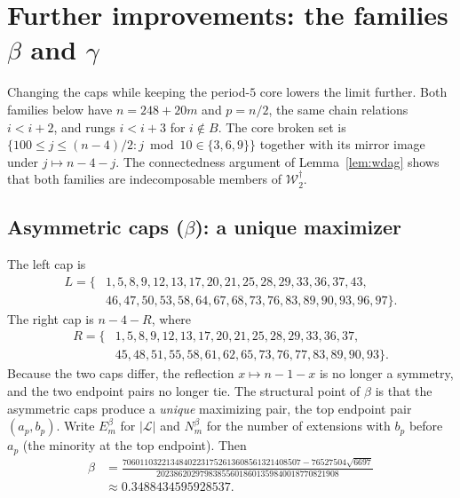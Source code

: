 \documentclass[11pt]{amsart}
\theoremstyle{definition}
\theoremstyle{remark}
\newcommand{\Lin}{\mathcal{L}}
\newcommand{\Wdag}{\mathcal{W}_2^{\dagger}}
\begin{document}
\section{Further improvements: the families $\beta$ and $\gamma$}\label{sec:bg}

Changing the caps while keeping the period-$5$ core lowers the limit further. Both families below have $n=248+20m$ and $p=n/2$, the same chain relations $i<i+2$, and rungs $i<i+3$ for $i\notin B$. The core broken set is $\{100\le j\le(n-4)/2: j\bmod10\in\{3,6,9\}\}$ together with its mirror image under $j\mapsto n-4-j$. The connectedness argument of Lemma~\ref{lem:wdag} shows that both families are indecomposable members of $\Wdag$.

\subsection*{Asymmetric caps ($\beta$): a unique maximizer} The left cap is
\[
\begin{aligned}L=\{&1,5,8,9,12,13,17,20,21,25,28,29,33,36,37,43,\\&46,47,50,53,58,64,67,68,73,76,83,89,90,93,96,97\}.\end{aligned}
\]
The right cap is $n-4-R$, where
\[
\begin{aligned}R=\{&1,5,8,9,12,13,17,20,21,25,28,29,33,36,37,\\&45,48,51,55,58,61,62,65,73,76,77,83,89,90,93\}.\end{aligned}
\]
Because the two caps differ, the reflection $x\mapsto n-1-x$ is no longer a symmetry, and the two endpoint pairs no longer tie. The structural point of $\beta$ is that the asymmetric caps produce a \emph{unique} maximizing pair, the top endpoint pair $(a_p,b_p)$. Write $E_m^{\beta}$ for $|\Lin|$ and $N_m^{\beta}$ for the number of extensions with $b_p$ before $a_p$ (the minority at the top endpoint). Then
\[
\begin{aligned}\beta&=\frac{70601103221348402231752613608561321408507-76527504\sqrt{6697}}{202386202979838556018601359840018770821908}\\&\approx0.3488434595928537 .\end{aligned}
\]
\end{document}
